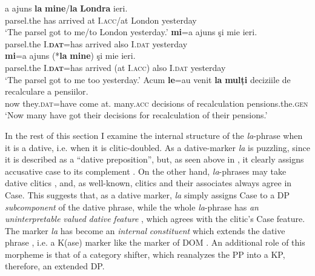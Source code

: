 \documentclass[output=paper,colorlinks,citecolor=brown,nonflat]{./langscibook}
\begin{document}
\ea%
      \label{ex:cornilescu:11}
         \ea \label{ex:cornilescu:11a}
          {a} {ajuns} \textbf{{la}} \textbf{mine}/\textbf{la} \textbf{{Londra}} {ieri}.	\\
         	 parsel.the has arrived at I.\textsc{acc}/at London yesterday\\
         \glt ‘The parsel got to me/to London yesterday.’
         \ex \label{ex:cornilescu:11b}
          \textbf{{mi}}{=a} {ajuns} {şi} {mie} {ieri.}	\\
         	parsel.the I.\textbf{\textsc{dat}}=has arrived also I.\textsc{dat} yesterday\\
         \ex \label{ex:cornilescu:11c}
          \textbf{{mi}}{=a} {ajuns} (*\textbf{la} \textbf{mine}) {şi} {mie} {ieri}.	\\
         parsel.the I.\textbf{\textsc{dat}}=has arrived (at I.\textsc{acc}) also I.\textsc{dat} yesterday\\
         \glt ‘The parsel got to me too yesterday.’
         \ex \label{ex:cornilescu:11d}
         \gll Acum \textbf{{le}}{=au} {venit} \textbf{{la}} \textbf{{mulți}} {deciziile} {de} {recalculare} {a pensiilor}.\\
         	now they.\textsc{dat}=have come at. many.\textsc{acc} decisions of  recalculation pensions.the.\textsc{gen}\\
         \glt ‘Now many have got their decisions for recalculation of their pensions.’
         \z 
         \z

In the rest of this section I examine the internal structure of the \textit{la}{}-phrase when it is a dative, i.e. when it is clitic-doubled. As a dative-marker \textit{la} is puzzling, since it is described as a “dative preposition”, but, as seen above in , it clearly assigns accusative case to its complement . On the other hand, \textit{la}{}-phrases may take dative clitics , and, as well-known, clitics and their associates always agree in Case. This suggests that, as a dative marker, \textit{la} simply assigns Case to a DP \textit{subcomponent} of the dative phrase, while the whole \textit{la}{}-phrase has \textit{an} \textit{uninterpretable} \textit{valued} \textit{dative} \textit{feature} , which agrees with the clitic’s Case feature. The marker \textit{la} has become an \textit{internal} \textit{constituent} which extends the dative phrase , i.e. a K(ase) marker like the marker of DOM \citep{López2011}. An additional role of this morpheme is that of a category shifter, which reanalyzes the PP into a KP, therefore, an extended DP.
\end{document}
